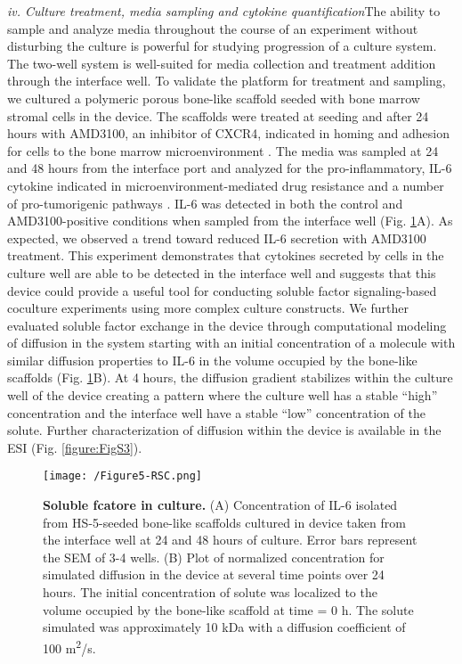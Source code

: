 \textit{iv. Culture treatment, media sampling and cytokine quantification}The ability to sample and analyze media throughout the course of an experiment without disturbing the culture is powerful for studying progression of a culture system. The two-well system is well-suited for media collection and treatment addition through the interface well. To validate the platform for treatment and sampling, we cultured a polymeric porous bone-like scaffold seeded with bone marrow stromal cells in the device. The scaffolds were treated at seeding and after 24 hours with AMD3100, an inhibitor of CXCR4, indicated in homing and adhesion for cells to the bone marrow microenvironment \cite{Alsayed2007, Burger2006}. The media was sampled at 24 and 48 hours from the interface port and analyzed for the pro-inflammatory, IL-6 cytokine indicated in microenvironment-mediated drug resistance and a number of pro-tumorigenic pathways \cite{Hodge2005, Roodman2001a, Vincent2005, Lin2007}. IL-6 was detected in both the control and AMD3100-positive conditions when sampled from the interface well (Fig. \ref{figure:Fig5}A). As expected, we observed a trend toward reduced IL-6 secretion with AMD3100 treatment. This experiment demonstrates that cytokines secreted by cells in the culture well are able to be detected in the interface well and suggests that this device could provide a useful tool for conducting soluble factor signaling-based coculture experiments using more complex culture constructs. We further evaluated soluble factor exchange in the device through computational modeling of diffusion in the system starting with an initial concentration of a molecule with similar diffusion properties to IL-6 in the volume occupied by the bone-like scaffolds (Fig. \ref{figure:Fig5}B). At 4 hours, the diffusion gradient stabilizes within the culture well of the device creating a pattern where the culture well has a stable “high” concentration and the interface well have a stable “low” concentration of the solute. Further characterization of diffusion within the device is available in the ESI (Fig. \ref{figure:FigS3}).    

\begin{figure}[ht] %
\centering
\texttt{[image: /Figure5-RSC.png]}
\caption{\textbf{Soluble fcatore in culture.} (A) Concentration of IL-6 isolated from HS-5-seeded bone-like scaffolds cultured in device taken from the interface well at 24 and 48 hours of culture. Error bars represent the SEM of 3-4 wells. (B) Plot of normalized concentration for simulated diffusion in the device at several time points over 24 hours. The initial concentration of solute was localized to the volume occupied by the bone-like scaffold at time = 0 h. The solute simulated was approximately 10 kDa with a diffusion coefficient of 100 \textmu m\textsuperscript{2}/s.}
\label{figure:Fig5}
\end{figure}


